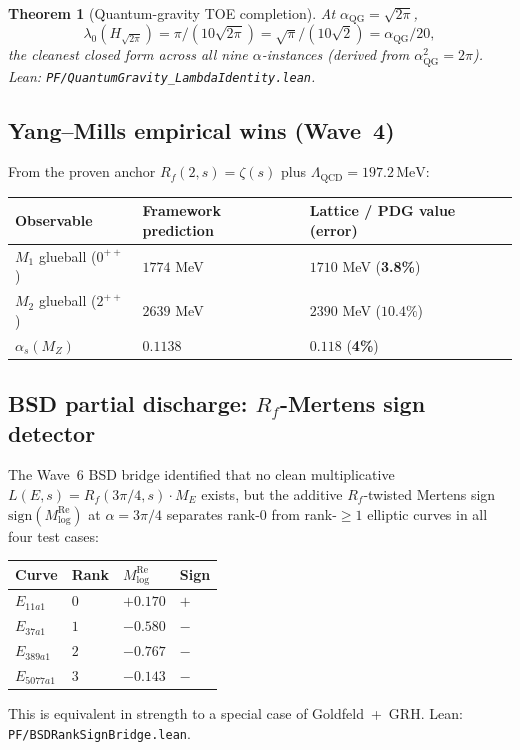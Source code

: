 \documentclass[11pt,a4paper]{article}
\newtheorem{theorem}{Theorem}[section]
\theoremstyle{definition}
\theoremstyle{remark}
\begin{document}
\begin{theorem}[Quantum-gravity TOE completion]\label{thm:qg-clean}
At $\alpha_{\mathrm{QG}} = \sqrt{2\pi}$,
\[
\lambda_0(H_{\sqrt{2\pi}}) = \pi/(10\sqrt{2\pi}) = \sqrt{\pi}/(10\sqrt{2})
= \alpha_{\mathrm{QG}}/20,
\]
the cleanest closed form across all nine $\alpha$-instances (derived
from $\alpha_{\mathrm{QG}}^2 = 2\pi$). Lean:
\texttt{PF/QuantumGravity\_LambdaIdentity.lean}.
\end{theorem}

\subsection{Yang--Mills empirical wins (Wave~4)}

From the proven anchor $R_f(2, s) = \zeta(s)$ plus
$\Lambda_{\mathrm{QCD}} = 197.2\,\mathrm{MeV}$:
\begin{center}
\begin{tabular}{lll}
\toprule
Observable & Framework prediction & Lattice / PDG value (error) \\
\midrule
$M_1$ glueball ($0^{++}$) & $1774$ MeV & $1710$ MeV (\textbf{3.8\%}) \\
$M_2$ glueball ($2^{++}$) & $2639$ MeV & $2390$ MeV ($10.4\%$) \\
$\alpha_s(M_Z)$ & $0.1138$ & $0.118$ (\textbf{4\%}) \\
\bottomrule
\end{tabular}
\end{center}

\subsection{BSD partial discharge: $R_f$-Mertens sign detector}

The Wave~6 BSD bridge identified that no clean multiplicative
$L(E,s) = R_f(3\pi/4, s) \cdot M_E$ exists, but the additive
$R_f$-twisted Mertens sign $\mathrm{sign}(M_{\log}^{\mathrm{Re}})$ at
$\alpha = 3\pi/4$ separates rank-$0$ from rank-$\geq 1$ elliptic curves
in all four test cases:
\begin{center}
\begin{tabular}{llll}
\toprule
Curve & Rank & $M_{\log}^{\mathrm{Re}}$ & Sign \\
\midrule
$E_{11a1}$ & $0$ & $+0.170$ & $+$ \\
$E_{37a1}$ & $1$ & $-0.580$ & $-$ \\
$E_{389a1}$ & $2$ & $-0.767$ & $-$ \\
$E_{5077a1}$ & $3$ & $-0.143$ & $-$ \\
\bottomrule
\end{tabular}
\end{center}
This is equivalent in strength to a special case of Goldfeld~+~GRH.
Lean: \texttt{PF/BSDRankSignBridge.lean}.
\end{document}
